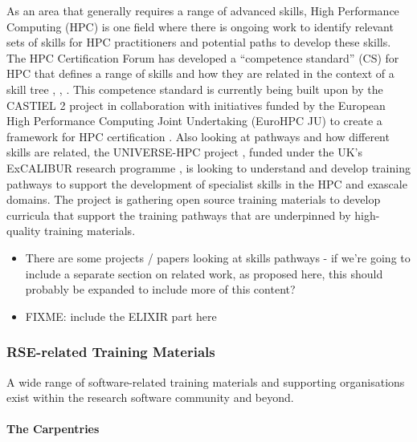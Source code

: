 \documentclass[a4paper
]{article}
\providecommand{\tightlist}{%
  \setlength{\itemsep}{0pt}\setlength{\parskip}{0pt}}
\begin{document}
As an area that generally requires a range of advanced skills, High
Performance Computing (HPC) is one field where there is ongoing work to
identify relevant sets of skills for HPC practitioners and potential
paths to develop these skills. The HPC Certification Forum has developed
a ``competence standard'' (CS) for HPC that defines a range of skills
and how they are related in the context of a skill tree
\autocite{HPCCFCompetencies}, \autocite{Kunkel2020a},
\autocite{Kunkel2020b}. This competence standard is currently being
built upon by the CASTIEL 2 \autocite{CASTIEL2} project in collaboration
with initiatives funded by the European High Performance Computing Joint
Undertaking (EuroHPC JU) to create a framework for HPC certification
\autocite{EuroHPCJU2023}. Also looking at pathways and how different
skills are related, the UNIVERSE-HPC project \autocite{UNIVERSEHPC},
funded under the UK's ExCALIBUR research programme \autocite{EXCALIBUR},
is looking to understand and develop training pathways to support the
development of specialist skills in the HPC and exascale domains. The
project is gathering open source training materials to develop curricula
that support the training pathways that are underpinned by high-quality
training materials.

\begin{itemize}
\tightlist
\item
  There are some projects / papers looking at skills pathways - if we're
  going to include a separate section on related work, as proposed here,
  this should probably be expanded to include more of this content?
\item
  FIXME: include the ELIXIR part here
\end{itemize}

\hypertarget{rse-related-training-materials}{%
\subsubsection{RSE-related Training
Materials}\label{rse-related-training-materials}}

A wide range of software-related training materials and supporting
organisations exist within the research software community and beyond.

\hypertarget{the-carpentries}{%
\paragraph{The Carpentries}\label{the-carpentries}}
\end{document}
